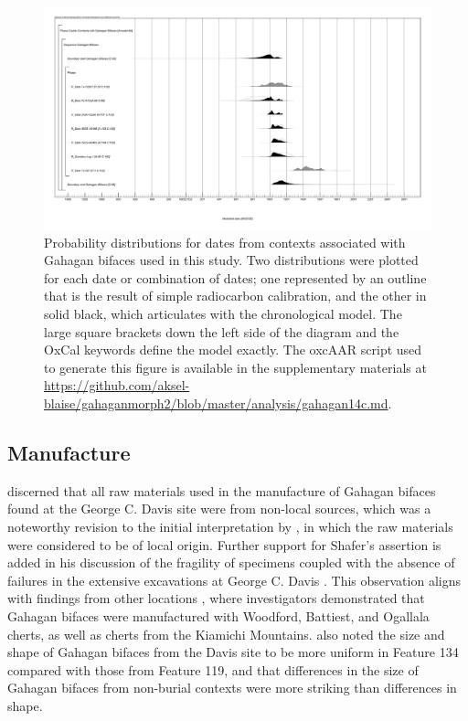 \documentclass[review]{elsarticle}
\begin{document}
\begin{figure}[ht]\centering
\includegraphics[width=\linewidth]{fig03}
\caption{Probability distributions for dates from contexts associated with Gahagan bifaces used in this study. Two distributions were plotted for each date or combination of dates; one represented by an outline that is the result of simple radiocarbon calibration, and the other in solid black, which articulates with the chronological model. The large square brackets down the left side of the diagram and the OxCal keywords define the model exactly. The oxcAAR script used to generate this figure is available in the supplementary materials at \href{https://github.com/aksel-blaise/gahaganmorph2/blob/master/analysis/gahagan14c.md}{https://github.com/aksel-blaise/gahaganmorph2/blob/master/analysis/gahagan14c.md}.}
\label{fig:fig3}
\end{figure}

\subsection*{Manufacture}

\citet{RN3684} discerned that all raw materials used in the manufacture of Gahagan bifaces found at the George C. Davis site were from non-local sources, which was a noteworthy revision to the initial interpretation by \citet{RN800}, in which the raw materials were considered to be of local origin. Further support for Shafer’s assertion is added in his discussion of the fragility of specimens coupled with the absence of failures in the extensive excavations at George C. Davis \citep{RN3684}. This observation aligns with findings from other locations \citep{RN1001}, where investigators demonstrated that Gahagan bifaces were manufactured with Woodford, Battiest, and Ogallala cherts, as well as cherts from the Kiamichi Mountains. \citet{RN3684} also noted the size and shape of Gahagan bifaces from the Davis site to be more uniform in Feature 134 compared with those from Feature 119, and that differences in the size of Gahagan bifaces from non-burial contexts were more striking than differences in shape.
\end{document}
